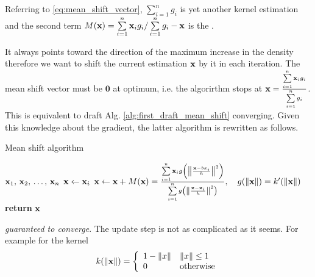 \documentclass[a4paper]{article}
\begin{document}
\begin{definition} 
Referring to \eqref{eq:mean_shift_vector}, 
$\sum \limits_{i=1}^{n}{g_i}$ is yet another kernel estimation and the second term $M(\textbf{x})  = \sum\limits_{i=1}^{n}{\textbf{x}_i g_i} / \sum\limits_{i=1}^{n}{g_i} - \textbf{x} $ is the .
\end{definition}
It always points toward the direction of the maximum increase in the density therefore we want to shift the current estimation $\textbf{x}$ by it in each iteration. The mean shift vector must be $\textbf{0}$ at optimum, i.e. the algorirthm stops at $\textbf{x} = \frac{\sum\limits_{i=1}^{n}{\textbf{x}_i g_i}}{\sum\limits_{i=1}^{n}{g_i}}$. This is equivalent to draft Alg. \ref{alg:first_draft_mean_shift} converging. Given this knowledge about the gradient, the latter algorithm is rewritten as follows.
\begin{algorithm}[H]
\caption{Mean shift algorithm}
\label{alg:mean_shift}
\begin{algorithmic}[1]
 {$\textbf{x}_1,\, \textbf{x}_2, \, \ldots, \, \textbf{x}_n$} 
\State $\textbf{x} \leftarrow \textbf{x}_i$
 
\State $\bx \leftarrow \bx + M(\bx) = 
 \frac{\sum \limits_{i=1}^{n}{\bx_i g\left(\norm{\frac{\bx - bx_i}{h}}^2 \right)}}%
{\sum\limits_{i=1}^{n}{g\left(\norm{\frac{\bx - \bx_i}{h}}^2 \right)}},\quad g(\norm{\bx}) = k^{\prime}(\norm{\bx})$
\EndWhile
\EndFor
\State \textbf{return} $\textbf{x}$
\EndProcedure
\end{algorithmic}
\end{algorithm}
 \textit{guaranteed to converge}.
The update step is not as complicated as it seems. For example for the kernel
\[
k(\left\lVert\textbf{x}\right\rVert) = \left\{
\begin{array}{ll}
      1-\left\lVert x\right\rVert & \left\lVert x\right\rVert \leq 1 \\
      0 & \textrm{otherwise}\\
\end{array} 
\right. 
\]
\end{document}
